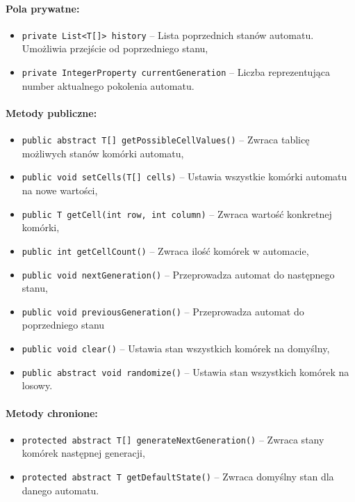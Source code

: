 \documentclass{report}
\begin{document}
\paragraph{Pola prywatne:}
\begin{itemize}
	\item \texttt{private List<T[]> history} -- Lista poprzednich stanów automatu. \\ Umożliwia przejście od poprzedniego stanu,
	\item \texttt{private IntegerProperty currentGeneration} -- Liczba reprezentująca number aktualnego pokolenia automatu.
\end{itemize}

\paragraph{Metody publiczne:}
\begin{itemize}
	\item \texttt{public abstract T[] getPossibleCellValues()} -- Zwraca tablicę możliwych stanów komórki automatu,
	\item \texttt{public void setCells(T[] cells)} -- Ustawia wszystkie komórki automatu na nowe wartości,
	\item \texttt{public T getCell(int row, int column)} -- Zwraca wartość konkretnej komórki,
	\item \texttt{public int getCellCount()} -- Zwraca ilość komórek w automacie,
	\item \texttt{public void nextGeneration()} -- Przeprowadza automat do następnego stanu,
	\item \texttt{public void previousGeneration()} -- Przeprowadza automat do poprzedniego stanu
	\item \texttt{public void clear()} -- Ustawia stan wszystkich komórek na domyślny,
	\item \texttt{public abstract void randomize()} -- Ustawia stan wszystkich komórek na losowy.
\end{itemize}

\paragraph{Metody chronione:}
\begin{itemize}
	\item \texttt{protected abstract T[] generateNextGeneration()} -- Zwraca stany komórek następnej generacji,
	\item \texttt{protected abstract T getDefaultState()} -- Zwraca domyślny stan dla danego automatu.
\end{itemize}
\end{document}
